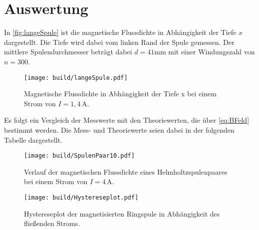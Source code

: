 \section{Auswertung}
\label{sec:Auswertung}

In \autoref{fig:langeSpule} ist die magnetische Flussdichte in Abhängigkeit der Tiefe $x$ dargestellt. Die Tiefe
wird dabei vom linken Rand der Spule gemessen. Der mittlere Spulendurchmesser beträgt dabei $d=41 \unit{\milli\meter}$
mit einer Windungszahl von $n=300$.
\begin{figure}[H]
    \centering
    \texttt{[image: build/langeSpule.pdf]}
    \caption{Magnetische Flussdichte in Abhängigkeit der Tiefe x bei einem Strom von $I= 1,4 \, \unit{\ampere}$.}
    \label{fig:langeSpule}
  \end{figure}


Es folgt ein Vergleich der Messwerte mit den Theoriewerten, die über \eqref{eq:BFeld} bestimmt werden.
Die Mess- und Theoriewerte seien dabei in der folgenden Tabelle dargestellt.


  \begin{figure}[H]
    \centering
    \texttt{[image: build/SpulenPaar10.pdf]}
    \caption{Verlauf der magnetischen Flussdichte eines Helmholtzspulenpaares bei einem Strom von $I= 4 \, \unit{\ampere}$.}
    \label{fig:SpulenPaar10}
  \end{figure}


\begin{figure}[H]
    \centering
    \texttt{[image: build/Hystereseplot.pdf]}
    \caption{Hystereseplot der magnetisierten Ringspule in Abhängigkeit des fließenden Stroms.}
    \label{fig:Hystereseplot}
  \end{figure}
